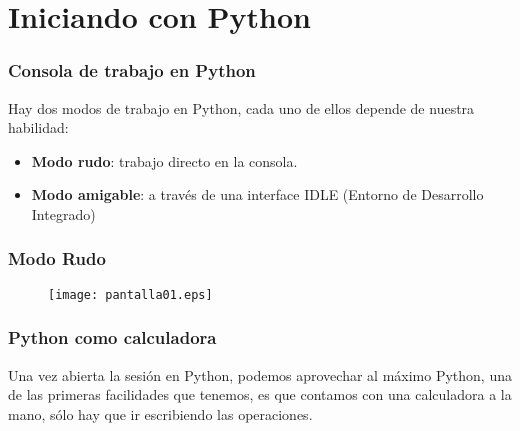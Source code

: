 \documentclass[12pt]{beamer}
\begin{document}
\section{Iniciando con Python}
\begin{frame}
\frametitle{Consola de trabajo en Python}
Hay dos modos de trabajo en Python, cada uno de ellos depende de nuestra habilidad:
\begin{itemize}
\item \textbf{Modo rudo}: trabajo directo en la consola.
\item \textbf{Modo amigable}: a trav\'{e}s de una interface IDLE (Entorno de Desarrollo Integrado)
\end{itemize}
\end{frame}
\begin{frame}
\frametitle{Modo Rudo}
\begin{figure}
	\centering
	\texttt{[image: pantalla01.eps]} 
\end{figure}
\end{frame}
\begin{frame}
\frametitle{Python como calculadora}
Una vez abierta la sesi\'{o}n en Python, podemos aprovechar al m\'{a}ximo Python, una de las primeras facilidades que tenemos, es que contamos con una calculadora a la mano, s\'{o}lo hay que ir escribiendo las operaciones.
\end{frame}
\end{document}

